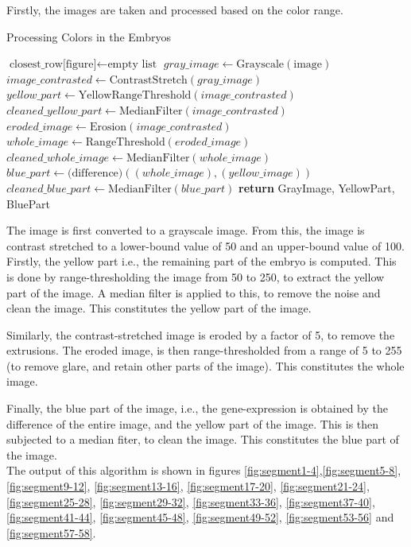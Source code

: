 \documentclass{article}
\begin{document}
Firstly, the images are taken and processed based on the color range. 
\begin{algorithm}[h!]
\caption{Processing Colors in the Embryos}\label{algo:processing_colors}
\begin{algorithmic}[1]
    \State $\text{closest\_row[figure]} \gets \text{empty list}$
        \State $gray\_image \gets \text{Grayscale}(\text{image})$
        \State $image\_contrasted \gets \text{ContrastStretch}(gray\_image)$
        \State $yellow\_part \gets \text{YellowRangeThreshold}(image\_contrasted)$
        \State $cleaned\_yellow\_part \gets \text{MedianFilter}(image\_contrasted)$
        \State $eroded\_image \gets \text{Erosion}(image\_contrasted)$
        \State $whole\_image \gets \text{RangeThreshold}(eroded\_image)$
        \State $cleaned\_whole\_image \gets \text{MedianFilter}(whole\_image)$
        \State $blue\_part \gets \text{(difference)}((whole\_image),(yellow\_image))$
        \State $cleaned\_blue\_part \gets \text{MedianFilter}(blue\_part)$
    \EndFor
    \State \textbf{return} GrayImage, YellowPart, BluePart
\EndProcedure
\end{algorithmic}
\end{algorithm}

The image is first converted to a grayscale image. From this, the image is contrast stretched to a lower-bound value of 50 and an upper-bound value of 100. \\Firstly, the yellow part i.e., the remaining part of the embryo is computed. This is done by range-thresholding the image from 50 to 250, to extract the yellow part of the image. A median filter is applied to this, to remove the noise and clean the image. This constitutes the yellow part of the image. 
\par Similarly, the contrast-stretched image is eroded by a factor of 5, to remove the extrusions. The eroded image, is then range-thresholded from a range of 5 to 255 (to remove glare, and retain other parts of the image). This constitutes the whole image. 
\par Finally, the blue part of the image, i.e., the gene-expression is obtained by the difference of the entire image, and the yellow part of the image. This is then subjected to a median fiter, to clean the image. This constitutes the blue part of the image. \\The output of this algorithm is shown in figures \ref{fig:segment1-4},\ref{fig:segment5-8},\ref{fig:segment9-12}, \ref{fig:segment13-16}, \ref{fig:segment17-20}, \ref{fig:segment21-24}, \ref{fig:segment25-28}, \ref{fig:segment29-32}, \ref{fig:segment33-36}, \ref{fig:segment37-40}, \ref{fig:segment41-44}, \ref{fig:segment45-48}, \ref{fig:segment49-52}, \ref{fig:segment53-56} and \ref{fig:segment57-58}.
\end{document}
